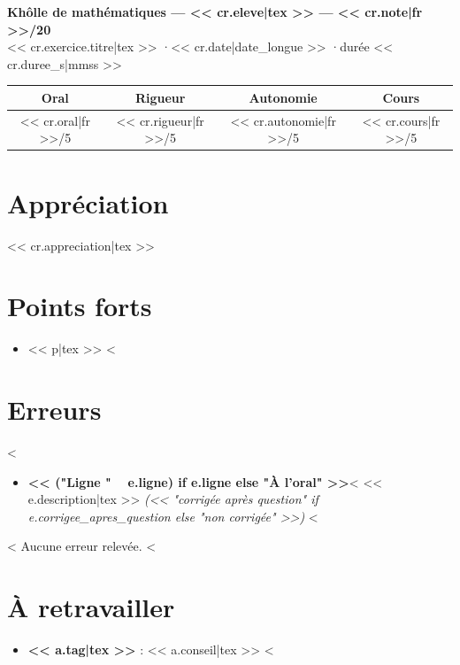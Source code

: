 \documentclass[11pt,a4paper]{article}
\begin{document}
\begin{center}
  {\Large\bfseries Khôlle de mathématiques --- << cr.eleve|tex >> --- << cr.note|fr >>/20}\\[4pt]
  << cr.exercice.titre|tex >> \quad·\quad << cr.date|date_longue >> \quad·\quad durée << cr.duree_s|mmss >>
\end{center}

\begin{center}
  \begin{tabular}{cccc}
    Oral & Rigueur & Autonomie & Cours \\
    \hline
    << cr.oral|fr >>/5 & << cr.rigueur|fr >>/5 & << cr.autonomie|fr >>/5 & << cr.cours|fr >>/5
  \end{tabular}
\end{center}

\section*{Appréciation}
<< cr.appreciation|tex >>

\section*{Points forts}
\begin{itemize}
<%
  \item << p|tex >>
<%
\end{itemize}

\section*{Erreurs}
<%
\begin{itemize}
<%
  \item \textbf{<< ("Ligne " ~ e.ligne) if e.ligne else "À l'oral" >>}<%
    << e.description|tex >> \emph{(<< "corrigée après question" if e.corrigee_apres_question else "non corrigée" >>)}
<%
\end{itemize}
<%
Aucune erreur relevée.
<%

\section*{À retravailler}
\begin{itemize}
<%
  \item \textbf{<< a.tag|tex >>} : << a.conseil|tex >>
<%
\end{itemize}
\end{document}
